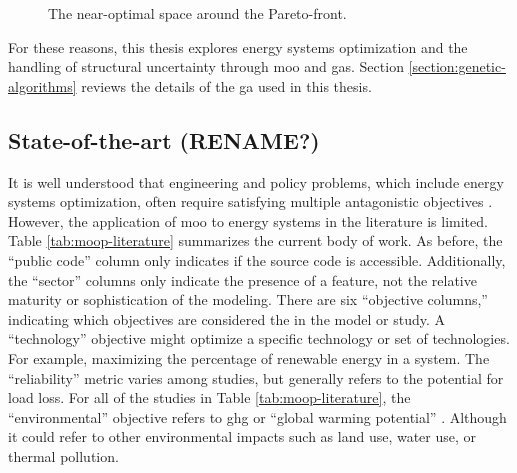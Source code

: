\begin{figure}[H]
  \centering
  \resizebox{0.6\columnwidth}{!}{}
  \caption{The near-optimal space around the Pareto-front.}
  \label{fig:near-opt-pareto}
\end{figure}

For these reasons, this thesis explores energy systems optimization and the handling of structural uncertainty through \ac{moo} and \acp{ga}. Section \ref{section:genetic-algorithms} reviews the details of the \ac{ga} used in this thesis.


\subsection{State-of-the-art (RENAME?)}
It is well understood that engineering and policy problems, which include energy 
systems optimization, often require satisfying multiple antagonistic objectives 
\cite{loughlin_genetic_2001,zechman_evolutionary_2004, zechman_evolutionary_2013,
chattopadhyay_need_2021}. However, the application of \ac{moo} to energy systems 
in the literature is limited. Table \ref{tab:moop-literature} summarizes the 
current body of work. As before, the ``public code'' column only indicates if the 
source code is accessible. Additionally, the ``sector'' columns only indicate the 
presence of a feature, not the relative maturity or sophistication of the modeling.
There are six ``objective columns,'' indicating which objectives are considered
the in the model or study. A ``technology'' objective might optimize a specific
technology or set of technologies. For example, maximizing the percentage of 
renewable energy in a system. The ``reliability'' metric varies among studies, but generally refers to the potential for load loss. For all of the studies in Table \ref{tab:moop-literature}, the ``environmental'' objective refers to \ac{ghg} or 
``global warming potential'' \cite{de-leon_almaraz_deployment_2015}. Although it could
refer to other environmental impacts such as land use, water use, or thermal 
pollution. 

